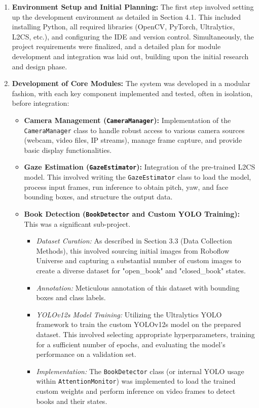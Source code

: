 \begin{enumerate}
    \item \textbf{Environment Setup and Initial Planning:}
    The first step involved setting up the development environment as detailed in Section 4.1. This included installing Python, all required libraries (OpenCV, PyTorch, Ultralytics, L2CS, etc.), and configuring the IDE and version control. Simultaneously, the project requirements were finalized, and a detailed plan for module development and integration was laid out, building upon the initial research and design phase.

    \item \textbf{Development of Core Modules:}
    The system was developed in a modular fashion, with each key component implemented and tested, often in isolation, before integration:
    \begin{itemize}
        \item \textbf{Camera Management (\texttt{CameraManager}):} Implementation of the \texttt{CameraManager} class to handle robust access to various camera sources (webcam, video files, IP streams), manage frame capture, and provide basic display functionalities.
        
        \item \textbf{Gaze Estimation (\texttt{GazeEstimator}):} Integration of the pre-trained L2CS model. This involved writing the \texttt{GazeEstimator} class to load the model, process input frames, run inference to obtain pitch, yaw, and face bounding boxes, and structure the output data.
        
        \item \textbf{Book Detection (\texttt{BookDetector} and Custom YOLO Training):} This was a significant sub-project.
        \begin{itemize}
            \item \textit{Dataset Curation:} As described in Section 3.3 (Data Collection Methods), this involved sourcing initial images from Roboflow Universe and capturing a substantial number of custom images to create a diverse dataset for "open\_book" and "closed\_book" states.
            \item \textit{Annotation:} Meticulous annotation of this dataset with bounding boxes and class labels.
            \item \textit{YOLOv12s Model Training:} Utilizing the Ultralytics YOLO framework to train the custom YOLOv12s model on the prepared dataset. This involved selecting appropriate hyperparameters, training for a sufficient number of epochs, and evaluating the model's performance on a validation set.
            \item \textit{Implementation:} The \texttt{BookDetector} class (or internal YOLO usage within \texttt{AttentionMonitor}) was implemented to load the trained custom weights and perform inference on video frames to detect books and their states.
        \end{itemize}
        

\end{itemize}
\end{enumerate}
